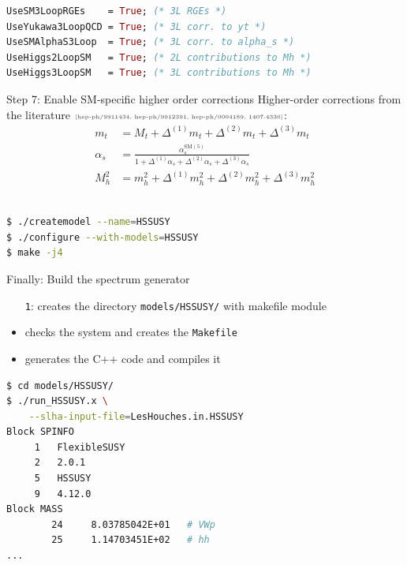 \documentclass[hyperref={pdfpagelabels=false},ngerman]{beamer}
\newcommand{\mycite}[1]{\ensuremath{\text{\textcolor{darkgray}{\tiny [#1]}}}}
\newcommand{\SM}{\ensuremath{\text{SM}}}
\newcommand{\as}{\alpha_s}
\begin{document}
\begin{lrbox}{\listbox}\begin{lstlisting}[language=Mathematica]
UseSM3LoopRGEs    = True; (* 3L RGEs *)
UseYukawa3LoopQCD = True; (* 3L corr. to yt *)
UseSMAlphaS3Loop  = True; (* 3L corr. to alpha_s *)
UseHiggs2LoopSM   = True; (* 2L contributions to Mh *)
UseHiggs3LoopSM   = True; (* 3L contributions to Mh *)
\end{lstlisting}\end{lrbox}

\begin{frame}{Step 7: Enable SM-specific higher order corrections}
  Higher-order corrections from the literature \mycite{hep-ph/9911434,
    hep-ph/9912391, hep-ph/0004189, 1407.4336}:
  \begin{align*}
    m_t &= M_t + \Delta^{(1)} m_t + \Delta^{(2)} m_t + \Delta^{(3)} m_t \\
    \alpha_s &= \frac{\alpha_s^{\SM(5)}}{1 + \Delta^{(1)} \as + \Delta^{(2)} \as + \Delta^{(3)} \as} \\
    M_h^2 &= m_h^2 + \Delta^{(1)} m_h^2 + \Delta^{(2)} m_h^2 + \Delta^{(3)} m_h^2
  \end{align*}
  \\[1em]
  \usebox{\listbox}
\end{frame}

\begin{lrbox}{\listbox}\begin{lstlisting}[language=bash]
$ ./createmodel --name=HSSUSY
$ ./configure --with-models=HSSUSY
$ make -j4
\end{lstlisting}\end{lrbox} %

\begin{frame}{Finally: Build the spectrum generator}
  \usebox{\listbox}
  \\[1em]
  \begin{itemize}
  \item[\texttt{1}:] creates the directory \lstinline{models/HSSUSY/}
    with makefile module
  \item[\texttt{2}:] checks the system and creates the \lstinline{Makefile}
  \item[\texttt{3}:] generates the C++ code and compiles it
  \end{itemize}
\end{frame}

\begin{lrbox}{\listbox}\begin{lstlisting}[language=bash]
$ cd models/HSSUSY/
$ ./run_HSSUSY.x \
    --slha-input-file=LesHouches.in.HSSUSY
Block SPINFO
     1   FlexibleSUSY
     2   2.0.1
     5   HSSUSY
     9   4.12.0
Block MASS
        24     8.03785042E+01   # VWp
        25     1.14703451E+02   # hh
...
\end{lstlisting}\end{lrbox} %
\end{document}
